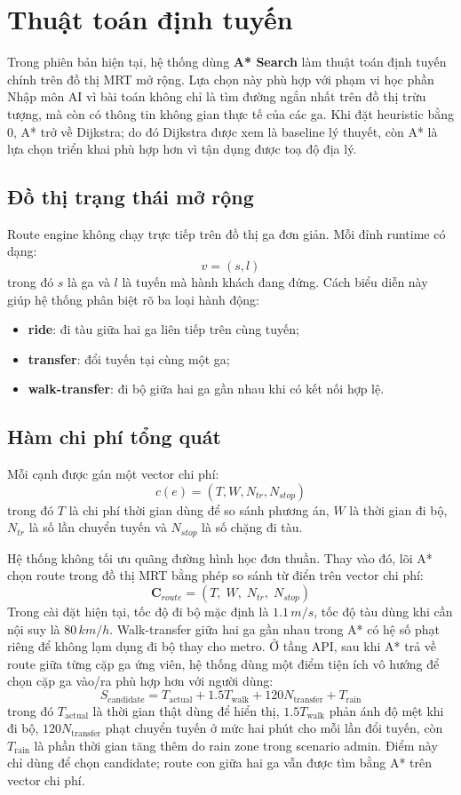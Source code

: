 \documentclass[../DoAn.tex]{subfiles}
\begin{document}
\section{Thuật toán định tuyến}
Trong phiên bản hiện tại, hệ thống dùng \textbf{A* Search} làm thuật toán định tuyến chính trên đồ thị MRT mở rộng.
Lựa chọn này phù hợp với phạm vi học phần Nhập môn AI vì bài toán không chỉ là tìm đường ngắn nhất trên đồ thị trừu tượng, mà còn có thông tin không gian thực tế của các ga.
Khi đặt heuristic bằng 0, A* trở về Dijkstra; do đó Dijkstra được xem là baseline lý thuyết, còn A* là lựa chọn triển khai phù hợp hơn vì tận dụng được toạ độ địa lý.

\subsection{Đồ thị trạng thái mở rộng}
Route engine không chạy trực tiếp trên đồ thị ga đơn giản.
Mỗi đỉnh runtime có dạng:
\[
v = (s, l)
\]
trong đó \(s\) là ga và \(l\) là tuyến mà hành khách đang đứng.
Cách biểu diễn này giúp hệ thống phân biệt rõ ba loại hành động:
\begin{itemize}
    \item \textbf{ride}: đi tàu giữa hai ga liên tiếp trên cùng tuyến;
    \item \textbf{transfer}: đổi tuyến tại cùng một ga;
    \item \textbf{walk-transfer}: đi bộ giữa hai ga gần nhau khi có kết nối hợp lệ.
\end{itemize}

\subsection{Hàm chi phí tổng quát}
Mỗi cạnh được gán một vector chi phí:
\[
c(e) = (T, W, N_{tr}, N_{stop})
\]
trong đó \(T\) là chi phí thời gian dùng để so sánh phương án, \(W\) là thời gian đi bộ, \(N_{tr}\) là số lần chuyển tuyến và \(N_{stop}\) là số chặng đi tàu.

Hệ thống không tối ưu quãng đường hình học đơn thuần.
Thay vào đó, lõi A* chọn route trong đồ thị MRT bằng phép so sánh từ điển trên vector chi phí:
\[
\mathbf{C}_{route} = (T,\; W,\; N_{tr},\; N_{stop})
\]
Trong cài đặt hiện tại, tốc độ đi bộ mặc định là \(1.1\,m/s\), tốc độ tàu dùng khi cần nội suy là \(80\,km/h\). Walk-transfer giữa hai ga gần nhau trong A* có hệ số phạt riêng để không lạm dụng đi bộ thay cho metro. Ở tầng API, sau khi A* trả về route giữa từng cặp ga ứng viên, hệ thống dùng một điểm tiện ích vô hướng để chọn cặp ga vào/ra phù hợp hơn với người dùng:
\[
S_{\text{candidate}} = T_{\text{actual}} + 1.5T_{\text{walk}} + 120N_{\text{transfer}} + T_{\text{rain}}
\]
trong đó \(T_{\text{actual}}\) là thời gian thật dùng để hiển thị, \(1.5T_{\text{walk}}\) phản ánh độ mệt khi đi bộ, \(120N_{\text{transfer}}\) phạt chuyển tuyến ở mức hai phút cho mỗi lần đổi tuyến, còn \(T_{\text{rain}}\) là phần thời gian tăng thêm do rain zone trong scenario admin. Điểm này chỉ dùng để chọn candidate; route con giữa hai ga vẫn được tìm bằng A* trên vector chi phí.
\end{document}
